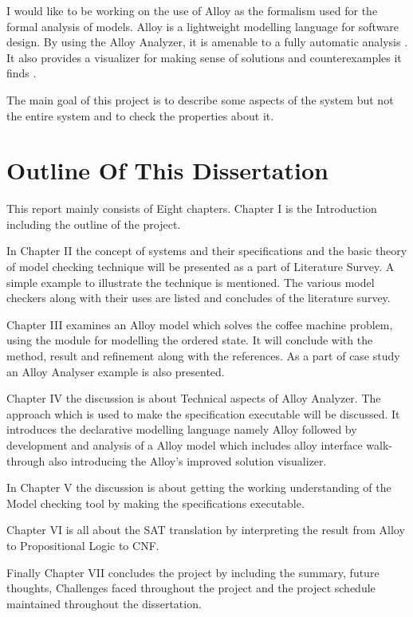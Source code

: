 \documentclass[a4paper,12pt]{report}
\begin{document}
\begin{onehalfspacing}
I would like to be working on the use of Alloy as the formalism used for the formal analysis of models. Alloy is a lightweight modelling language for software design. By using the Alloy Analyzer, it is amenable to a fully automatic analysis \cite{J.M.Wing1996}. It also provides a visualizer for making sense of solutions and counterexamples it finds \cite{A.Blandford2000}.

The main goal of this project is to describe some aspects of the system but not the entire system and to check the properties about it. 
 
\section{Outline Of This Dissertation}
\label{Outline dissert}

This report mainly consists of Eight chapters. Chapter I is the Introduction including the outline of the project.

In Chapter II the concept of systems and their specifications and the basic theory of model checking technique will be presented as a part of Literature Survey. A simple example to illustrate the technique is mentioned. The various model checkers along with their uses are listed and concludes of the literature survey.

Chapter III examines an Alloy model which solves the coffee machine problem, using the module for modelling the ordered state. It will conclude with the method, result and refinement along with the references. As a part of case study an Alloy Analyser example is also presented.

Chapter IV the discussion is about Technical aspects of Alloy Analyzer. The approach which is used to make the specification executable will be discussed. It introduces the declarative modelling language namely Alloy followed by development and analysis of a Alloy model which includes alloy interface walk-through also introducing the Alloy's improved solution visualizer. 

In Chapter V the discussion is about getting the working understanding of the Model checking tool by making the specifications executable.

Chapter VI is all about the SAT translation by interpreting the result from Alloy to Propositional Logic to CNF. 

Finally Chapter VII concludes the project by including the summary, future thoughts, Challenges faced throughout the project and the project schedule maintained throughout the dissertation.


\end{onehalfspacing}
\end{document}
